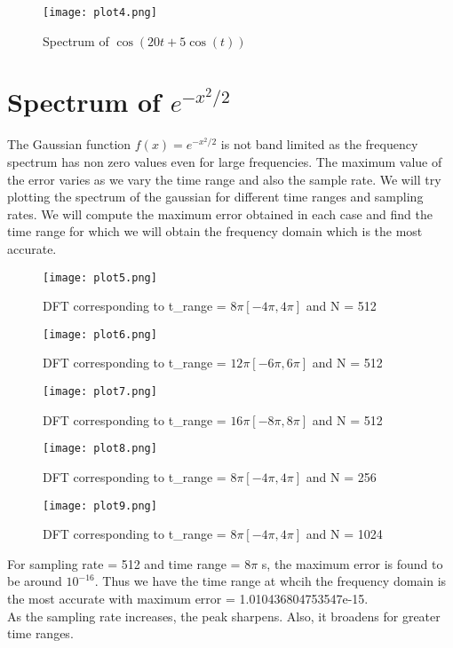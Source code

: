\documentclass{article}
\begin{document}
\begin{figure}[H]
\texttt{[image: plot4.png]}
\centering
\caption{Spectrum of $\cos(20t + 5\cos(t))$}
\label{fig:fig5}
\end{figure}


\section{Spectrum of $e^{-x^2/2}$}
The Gaussian function $f(x) = e^{-x^2/2}$ is not band limited as the frequency spectrum has non zero values even for large frequencies. The maximum value of the error varies as we vary the time range and also the sample rate. We will try plotting the spectrum of the gaussian for different time ranges and sampling rates. We will compute the maximum error obtained in each case and find the time range for which we will obtain the frequency domain which is the most accurate.
\begin{figure}[H]
\texttt{[image: plot5.png]}
\centering
\caption{DFT corresponding to t\_range = $8\pi [-4\pi , 4\pi]$ and N = 512}
\label{fig:fig6}
\end{figure}

\begin{figure}[H]
\texttt{[image: plot6.png]}
\centering
\caption{DFT corresponding to t\_range = $12\pi[-6\pi , 6\pi]$ and N = 512}
\label{fig:fig7}
\end{figure}

\begin{figure}[H]
\texttt{[image: plot7.png]}
\centering
\caption{DFT corresponding to t\_range = $16\pi[-8\pi , 8\pi]$ and N = 512}
\label{fig:fig8}
\end{figure}

\begin{figure}[H]
\texttt{[image: plot8.png]}
\centering
\caption{DFT corresponding to t\_range = $8\pi [-4\pi , 4\pi]$ and N = 256}
\label{fig:fig9}
\end{figure}

\begin{figure}[H]
\texttt{[image: plot9.png]}
\centering
\caption{DFT corresponding to t\_range = $8\pi [-4\pi , 4\pi]$ and N = 1024}
\label{fig:fig10}
\end{figure}

For sampling rate = 512 and time range = $8\pi$ s, the maximum error is found to be around $10^{-16}$. Thus we have the time range at whcih the frequency domain is the most accurate with maximum error = 1.010436804753547e-15. \\As the sampling rate increases, the peak sharpens. Also, it broadens for greater time ranges.
\end{document}

